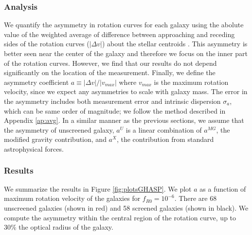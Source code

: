 \documentclass[useAMS,usenatbib,twocolumn]{mn2e}
\begin{document}
\subsubsection{Analysis}
We quantify the asymmetry in rotation curves for each galaxy
using the abolute value of the weighted average of difference between
approaching and receding sides of the rotation curves ($|\Delta v|$) about the
stellar centroids \citep{epinat08a}. This asymmetry is better seen near the
center of the galaxy and therefore we focus on the inner part of the
rotation curves. However, we find that our results do not depend
significantly on the location of the measurement. Finally, we define the
asymmetry coefficient $a \equiv |\Delta v| / |v_{max}|$ where $v_{max}$ is the
maximum rotation velocity, since we expect any asymmetries to scale with
galaxy mass.
The error in the asymmetry
includes both measurement error and intrinsic dispersion $\sigma_a$, which
can be same order of magnitude; we follow the method described in Appendix
\ref{ap:avg}. In a similar manner as the previous sections, we assume that
the asymmetry of unscreened galaxy, $a^U$ is a linear combination of
$a^{MG}$, the modified gravity contribution, and $a^X$, the contribution from
standard astrophysical forces.

% 


\subsubsection{Results}
We summarize the results in Figure \ref{fig:plotsGHASP}.  We plot  $a$
as a function of maximum rotation velocity of the galaxies for
$f_{R0}=10^{-6}$. There are 68 unscreened galaxies
(shown in red) and 58 screened galaxies (shown in black).
We compute the asymmetry within the central region of the rotation curve,
up to 30\% the optical radius of the galaxy.
\end{document}
